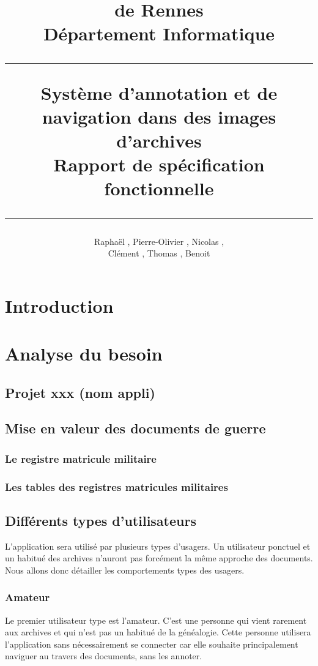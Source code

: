 \documentclass[a4paper]{article}
\title{\bsc{INSA} de Rennes \\ Département Informatique \\ \bigskip \hrule \bigskip Système d'annotation et de navigation dans des images d'archives \\ \bigskip Rapport de spécification fonctionnelle \bigskip \hrule}
\author{Raphaël \bsc{Baron}, Pierre-Olivier \bsc{Bouteau}, Nicolas \bsc{Charpentier}, \\ Clément \bsc{Leboullenger}, Thomas \bsc{François}, Benoit \bsc{Travers}}
\begin{document}
\maketitle
\thispagestyle{empty}

\newpage
\tableofcontents
\thispagestyle{empty}

\newpage
\section*{Introduction}

\section{Analyse du besoin}
\subsection{Projet xxx (nom appli)}

\subsection{Mise en valeur des documents de guerre}
\subsubsection{Le registre matricule militaire}
\subsubsection{Les tables des registres matricules militaires}

\subsection{Différents types d'utilisateurs}
L'application sera utilisé par plusieurs types d'usagers. Un utilisateur ponctuel et un habitué des archives n'auront pas forcément la même approche des documents. Nous allons donc détailler les comportements types des usagers.

\subsubsection{Amateur}
Le premier utilisateur type est l'amateur. C'est une personne qui vient rarement aux archives et qui n'est pas un habitué de la généalogie. Cette personne utilisera l'application sans nécessairement se connecter car elle souhaite principalement naviguer au travers des documents, sans les annoter.
\end{document}
